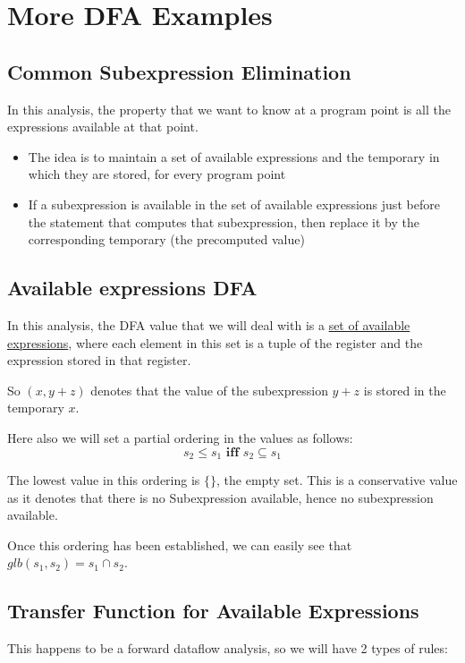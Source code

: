 \setlength{\parindent}{0pt}
\clearpage

\section{More DFA Examples}

\subsection{Common Subexpression Elimination}


In this analysis, the property that we want to know at a program point is all the expressions available at that point.
\begin{itemize}
    \item The idea is to maintain a set of available expressions and the temporary in which they are stored, for every program point
    \item If a subexpression is available in the set of available expressions just before the statement that computes that subexpression, then replace it by the corresponding temporary (the precomputed value)
\end{itemize}


\subsection{Available expressions DFA}
In this analysis, the DFA value that we will deal with is a \underline{set of available expressions}, where each element in this set is a tuple of the register and the expression stored in that register.

So $(x, y+z)$ denotes that the value of the subexpression $y+z$ is stored in the temporary $x$.

\vspace{0.5cm}
Here also we will set a partial ordering in the values as follows:\\
$$s_2 \leqslant s_1 \textbf{ iff } s_2 \subseteq s_1$$

The lowest value in this ordering is $\{\}$, the empty set. This is a conservative value as it denotes that there is no Subexpression available, hence no subexpression available.

Once this ordering has been established, we can easily see that $glb(s_1,s_2) = s_1 \cap s_2$.

\subsection{Transfer Function for Available Expressions}
This happens to be a forward dataflow analysis, so we will have 2 types of rules:

